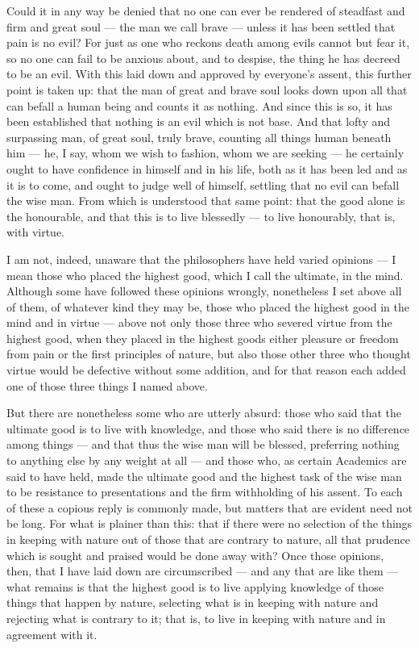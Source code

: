  Could it in any way be denied that no one can ever be rendered of steadfast and firm and great soul — the man we call brave — unless it has been settled that pain is no evil? For just as one who reckons death among evils cannot but fear it, so no one can fail to be anxious about, and to despise, the thing he has decreed to be an evil. With this laid down and approved by everyone's assent, this further point is taken up: that the man of great and brave soul looks down upon all that can befall a human being and counts it as nothing. And since this is so, it has been established that nothing is an evil which is not base. And that lofty and surpassing man, of great soul, truly brave, counting all things human beneath him — he, I say, whom we wish to fashion, whom we are seeking — he certainly ought to have confidence in himself and in his life, both as it has been led and as it is to come, and ought to judge well of himself, settling that no evil can befall the wise man. From which is understood that same point: that the good alone is the honourable, and that this is to live blessedly — to live honourably, that is, with virtue.

 I am not, indeed, unaware that the philosophers have held varied opinions — I mean those who placed the highest good, which I call the ultimate, in the mind. Although some have followed these opinions wrongly, nonetheless I set above all of them, of whatever kind they may be, those who placed the highest good in the mind and in virtue — above not only those three who severed virtue from the highest good, when they placed in the highest goods either pleasure or freedom from pain or the first principles of nature, but also those other three who thought virtue would be defective without some addition, and for that reason each added one of those three things I named above.

 But there are nonetheless some who are utterly absurd: those who said that the ultimate good is to live with knowledge, and those who said there is no difference among things — and that thus the wise man will be blessed, preferring nothing to anything else by any weight at all — and those who, as certain Academics are said to have held, made the ultimate good and the highest task of the wise man to be resistance to presentations and the firm withholding of his assent. To each of these a copious reply is commonly made, but matters that are evident need not be long. For what is plainer than this: that if there were no selection of the things in keeping with nature out of those that are contrary to nature, all that prudence which is sought and praised would be done away with? Once those opinions, then, that I have laid down are circumscribed — and any that are like them — what remains is that the highest good is to live applying knowledge of those things that happen by nature, selecting what is in keeping with nature and rejecting what is contrary to it; that is, to live in keeping with nature and in agreement with it.

